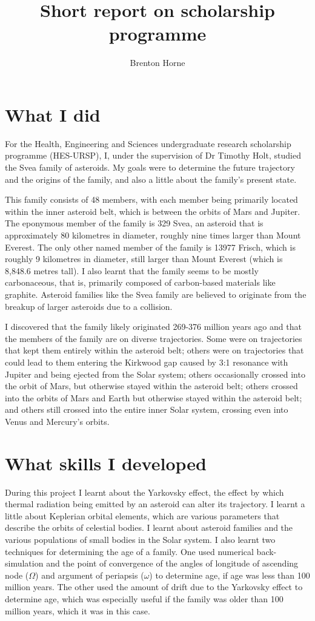 \documentclass[12pt,a4paper]{article}
\title{Short report on scholarship programme}
\author{Brenton Horne}
\begin{document}
\maketitle

\section{What I did}
For the Health, Engineering and Sciences undergraduate research scholarship programme (HES-URSP), I, under the supervision of Dr Timothy Holt, studied the Svea family of asteroids. My goals were to determine the future trajectory and the origins of the family, and also a little about the family's present state. 

This family consists of 48 members, with each member being primarily located within the inner asteroid belt, which is between the orbits of Mars and Jupiter. The eponymous member of the family is 329 Svea, an asteroid that is approximately 80 kilometres in diameter, roughly nine times larger than Mount Everest. The only other named member of the family is 13977 Frisch, which is roughly 9 kilometres in diameter, still larger than Mount Everest (which is 8,848.6 metres tall). I also learnt that the family seems to be mostly carbonaceous, that is, primarily composed of carbon-based materials like graphite. Asteroid families like the Svea family are believed to originate from the breakup of larger asteroids due to a collision. 

I discovered that the family likely originated 269-376 million years ago and that the members of the family are on diverse trajectories. Some were on trajectories that kept them entirely within the asteroid belt; others were on trajectories that could lead to them entering the Kirkwood gap caused by 3:1 resonance with Jupiter and being ejected from the Solar system; others occasionally crossed into the orbit of Mars, but otherwise stayed within the asteroid belt; others crossed into the orbits of Mars and Earth but otherwise stayed within the asteroid belt; and others still crossed into the entire inner Solar system, crossing even into Venus and Mercury's orbits. 

\section{What skills I developed}
During this project I learnt about the Yarkovsky effect, the effect by which thermal radiation being emitted by an asteroid can alter its trajectory. I learnt a little about Keplerian orbital elements, which are various parameters that describe the orbits of celestial bodies. I learnt about asteroid families and the various populations of small bodies in the Solar system. I also learnt two techniques for determining the age of a family. One used numerical back-simulation and the point of convergence of the angles of longitude of ascending node ($\Omega$) and argument of periapsis ($\omega$) to determine age, if age was less than 100 million years. The other used the amount of drift due to the Yarkovsky effect to determine age, which was especially useful if the family was older than 100 million years, which it was in this case. 
\end{document}
